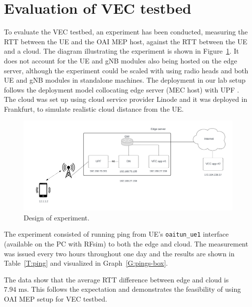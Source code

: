 \documentclass[12pt,a4paper,twoside]{report}
\begin{document}
\section{Evaluation of VEC testbed}
To evaluate the VEC testbed, an experiment has been conducted, measuring the RTT between the UE and the OAI MEP host, against the RTT between the UE and a cloud. The diagram illustrating the experiment is shown in Figure~\ref{F:experiment}. It does not account for the UE and gNB modules also being hosted on the edge server, although the experiment could be scaled with using radio heads and both UE and gNB modules in standalone machines. The deployment in our lab setup follows the deployment model collocating edge server (MEC host) with UPF \cite{ETSI:wp28}. The cloud was set up using cloud service provider Linode and it was deployed in Frankfurt, to simulate realistic cloud distance from the UE.
\begin{figure}[!ht]
	\centering
	\includegraphics[width=\textwidth]{./images/experiment.png} 
	\caption{Design of experiment.}
	\label{F:experiment}
\end{figure}
%
The experiment consisted of running ping from UE’s \verb|oaitun_ue1| interface (available on the PC with RFsim) to both the edge and cloud. The measurement was issued every two hours throughout one day and the results are shown in Table~\ref{T:ping} and visualized in Graph~\ref{G:pings-box}. 

The data show that the average RTT difference between edge and cloud is $7.94 \mbox{ ms}$. This follows the expectation and demonstrates the feasibility of using OAI MEP setup for VEC testbed.
\end{document}
